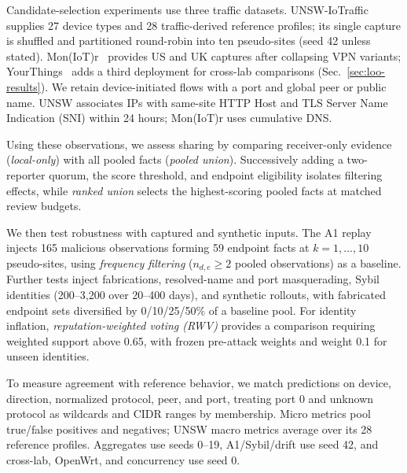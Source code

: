 \documentclass[journal]{IEEEtran}
\theoremstyle{definition}
\begin{document}
Candidate-selection experiments use three traffic datasets. UNSW-IoTraffic~\cite{sivanathan2019classifying} supplies 27 device types and 28 traffic-derived reference profiles; its single capture is shuffled and partitioned round-robin into ten pseudo-sites (seed 42 unless stated). Mon(IoT)r~\cite{moniotr} provides US and UK captures after collapsing VPN variants; YourThings~\cite{alrawi2019yourthings} adds a third deployment for cross-lab comparisons (Sec.~\ref{sec:loo-results}). We retain device-initiated flows with a port and global peer or public name. UNSW associates IPs with same-site HTTP Host and TLS Server Name Indication (SNI) within 24 hours; Mon(IoT)r uses cumulative DNS.

Using these observations, we assess sharing by comparing receiver-only evidence (\emph{local-only}) with all pooled facts (\emph{pooled union}). Successively adding a two-reporter quorum, the score threshold, and endpoint eligibility isolates filtering effects, while \emph{ranked union} selects the highest-scoring pooled facts at matched review budgets.

We then test robustness with captured and synthetic inputs. The A1 replay injects 165 malicious observations forming 59 endpoint facts at $k=1,\ldots,10$ pseudo-sites, using \emph{frequency filtering} ($n_{d,e}\ge2$ pooled observations) as a baseline. Further tests inject fabrications, resolved-name and port masquerading, Sybil identities (200--3,200 over 20--400 days), and synthetic rollouts, with fabricated endpoint sets diversified by 0/10/25/50\% of a baseline pool. For identity inflation, \emph{reputation-weighted voting (RWV)} provides a comparison requiring weighted support above 0.65, with frozen pre-attack weights and weight 0.1 for unseen identities.

To measure agreement with reference behavior, we match predictions on device, direction, normalized protocol, peer, and port, treating port 0 and unknown protocol as wildcards and CIDR ranges by membership. Micro metrics pool true/false positives and negatives; UNSW macro metrics average over its 28 reference profiles. Aggregates use seeds 0--19, A1/Sybil/drift use seed 42, and cross-lab, OpenWrt, and concurrency use seed 0.
\end{document}
